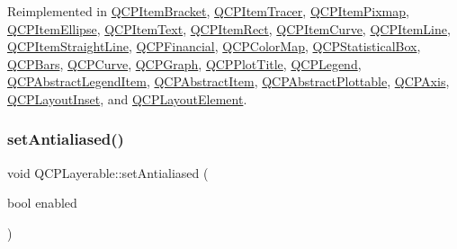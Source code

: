 Reimplemented in \hyperlink{class_q_c_p_item_bracket_a971299aa6fef75730d6f10efdaf48616}{Q\+C\+P\+Item\+Bracket}, \hyperlink{class_q_c_p_item_tracer_ae1dc728384936184e7552a6d0d67fd75}{Q\+C\+P\+Item\+Tracer}, \hyperlink{class_q_c_p_item_pixmap_a7583a98ebd3f35d2ac5d6c05fad25a6c}{Q\+C\+P\+Item\+Pixmap}, \hyperlink{class_q_c_p_item_ellipse_aa41be2180b2ace2e303b88d005c14243}{Q\+C\+P\+Item\+Ellipse}, \hyperlink{class_q_c_p_item_text_aca74494fd5e769f331a6eb3e29f32916}{Q\+C\+P\+Item\+Text}, \hyperlink{class_q_c_p_item_rect_abe1a6091591d3bad5e4efab2331f99ec}{Q\+C\+P\+Item\+Rect}, \hyperlink{class_q_c_p_item_curve_a8018b8b3fc552a44ba87ca4b64c1523f}{Q\+C\+P\+Item\+Curve}, \hyperlink{class_q_c_p_item_line_ae6cc5183f568e5fa9d7827abe4d405b5}{Q\+C\+P\+Item\+Line}, \hyperlink{class_q_c_p_item_straight_line_a1e5d99d79efb5871600c72bcd2891a0f}{Q\+C\+P\+Item\+Straight\+Line}, \hyperlink{class_q_c_p_financial_a77bffad8f3fcbcccbef03ead1c538e3a}{Q\+C\+P\+Financial}, \hyperlink{class_q_c_p_color_map_aba91ea58b489031157ecb777fe79e309}{Q\+C\+P\+Color\+Map}, \hyperlink{class_q_c_p_statistical_box_a0153ac16326b94450afbca208e3f9961}{Q\+C\+P\+Statistical\+Box}, \hyperlink{class_q_c_p_bars_a62d66cc8eedca6bedfc1f6513164d418}{Q\+C\+P\+Bars}, \hyperlink{class_q_c_p_curve_a87a9fb34a2a48dcae4c1245ada235e7d}{Q\+C\+P\+Curve}, \hyperlink{class_q_c_p_graph_a36011c34aca4f7a477de25961e2f6c13}{Q\+C\+P\+Graph}, \hyperlink{class_q_c_p_plot_title_aae4bcb2401e6947ea0abd3c960488d35}{Q\+C\+P\+Plot\+Title}, \hyperlink{class_q_c_p_legend_acd7be544c81324e391cfa6be9c413c01}{Q\+C\+P\+Legend}, \hyperlink{class_q_c_p_abstract_legend_item_ac834bf9003c491e5064a31e2a7de418d}{Q\+C\+P\+Abstract\+Legend\+Item}, \hyperlink{class_q_c_p_abstract_item_a96d522d10ffc0413b9a366c6f7f0476b}{Q\+C\+P\+Abstract\+Item}, \hyperlink{class_q_c_p_abstract_plottable_a38efe9641d972992a3d44204bc80ec1d}{Q\+C\+P\+Abstract\+Plottable}, \hyperlink{class_q_c_p_axis_a48e4f1bafd1826ba2ad46b691205bb90}{Q\+C\+P\+Axis}, \hyperlink{class_q_c_p_layout_inset_afcd56d5d1b8853838cdc535f1904f68a}{Q\+C\+P\+Layout\+Inset}, and \hyperlink{class_q_c_p_layout_element_a0b96ae0d7bcfa6e38188fcb1e73e143f}{Q\+C\+P\+Layout\+Element}.

\hypertarget{class_q_c_p_layerable_a4fd43e89be4a553ead41652565ff0581}{}\label{class_q_c_p_layerable_a4fd43e89be4a553ead41652565ff0581} 
\subsubsection{\texorpdfstring{set\+Antialiased()}{setAntialiased()}}
{\footnotesize\ttfamily void Q\+C\+P\+Layerable\+::set\+Antialiased (\begin{DoxyParamCaption}\item[{bool}]{enabled }\end{DoxyParamCaption})}

